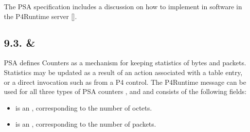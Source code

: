 \documentclass[11pt]{article}
\begin{document}
{%
The PSA specification includes a discussion on how to implement
 in software in the P4Runtime server
[].%

\subsection{9.3.\hspace*{0.5em} \& }\label{sec-counterentry-directcounterentry}%

\noindent{}PSA defines Counters as a mechanism for keeping statistics of bytes and packets.
Statistics may be updated as a result of an action associated with a table
entry, or a direct invocation such as from a P4 control. The 
P4Runtime message can be used for all three types of PSA counters \textemdash{} ,
 and  \textemdash{} and consists of the following fields:%

\begin{itemize}[noitemsep,topsep=\mdcompacttopsep]%

\item{} is an , corresponding to the number of octets.%

\item{} is an , corresponding to the number of packets.%
\end{itemize}%

}
\end{document}
